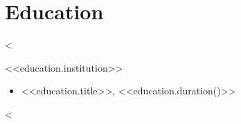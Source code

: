 \section{Education}
<%
\begin{description}
    \item [<<education.institution>>]
\end{description}
\begin{itemize}[leftmargin=0.05\textwidth]
    \item <<education.title>>, <<education.duration()>>
\end{itemize}
<%
